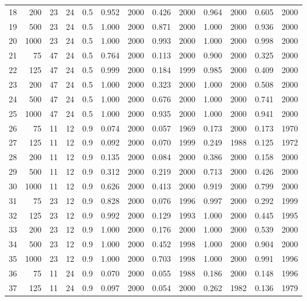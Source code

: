\documentclass{article}
\begin{document}
\begin{table}[ht]
\begin{center}
\begin{tabular}{rrrrrrrrrrrrr}
  18 & 200 & 23 & 24 & 0.5 & 0.952 & 2000 & 0.426 & 2000 & 0.964 & 2000 & 0.605 & 2000 \\ 
  19 & 500 & 23 & 24 & 0.5 & 1.000 & 2000 & 0.871 & 2000 & 1.000 & 2000 & 0.936 & 2000 \\ 
  20 & 1000 & 23 & 24 & 0.5 & 1.000 & 2000 & 0.993 & 2000 & 1.000 & 2000 & 0.998 & 2000 \\ 
   \hline
21 & 75 & 47 & 24 & 0.5 & 0.764 & 2000 & 0.113 & 2000 & 0.900 & 2000 & 0.325 & 2000 \\ 
  22 & 125 & 47 & 24 & 0.5 & 0.999 & 2000 & 0.184 & 1999 & 0.985 & 2000 & 0.409 & 2000 \\ 
  23 & 200 & 47 & 24 & 0.5 & 1.000 & 2000 & 0.323 & 2000 & 1.000 & 2000 & 0.508 & 2000 \\ 
  24 & 500 & 47 & 24 & 0.5 & 1.000 & 2000 & 0.676 & 2000 & 1.000 & 2000 & 0.741 & 2000 \\ 
  25 & 1000 & 47 & 24 & 0.5 & 1.000 & 2000 & 0.935 & 2000 & 1.000 & 2000 & 0.941 & 2000 \\ 
   \hline
26 & 75 & 11 & 12 & 0.9 & 0.074 & 2000 & 0.057 & 1969 & 0.173 & 2000 & 0.173 & 1970 \\ 
  27 & 125 & 11 & 12 & 0.9 & 0.092 & 2000 & 0.070 & 1999 & 0.249 & 1988 & 0.125 & 1972 \\ 
  28 & 200 & 11 & 12 & 0.9 & 0.135 & 2000 & 0.084 & 2000 & 0.386 & 2000 & 0.158 & 2000 \\ 
  29 & 500 & 11 & 12 & 0.9 & 0.312 & 2000 & 0.219 & 2000 & 0.713 & 2000 & 0.426 & 2000 \\ 
  30 & 1000 & 11 & 12 & 0.9 & 0.626 & 2000 & 0.413 & 2000 & 0.919 & 2000 & 0.799 & 2000 \\ 
   \hline
31 & 75 & 23 & 12 & 0.9 & 0.828 & 2000 & 0.076 & 1996 & 0.997 & 2000 & 0.292 & 1999 \\ 
  32 & 125 & 23 & 12 & 0.9 & 0.992 & 2000 & 0.129 & 1993 & 1.000 & 2000 & 0.445 & 1995 \\ 
  33 & 200 & 23 & 12 & 0.9 & 1.000 & 2000 & 0.176 & 2000 & 1.000 & 2000 & 0.539 & 2000 \\ 
  34 & 500 & 23 & 12 & 0.9 & 1.000 & 2000 & 0.452 & 1998 & 1.000 & 2000 & 0.904 & 2000 \\ 
  35 & 1000 & 23 & 12 & 0.9 & 1.000 & 2000 & 0.703 & 1998 & 1.000 & 2000 & 0.991 & 1996 \\ 
   \hline
36 & 75 & 11 & 24 & 0.9 & 0.070 & 2000 & 0.055 & 1988 & 0.186 & 2000 & 0.148 & 1996 \\ 
  37 & 125 & 11 & 24 & 0.9 & 0.097 & 2000 & 0.054 & 2000 & 0.262 & 1982 & 0.136 & 1979 \\ 

\end{tabular}
\end{center}
\end{table}
\end{document}
